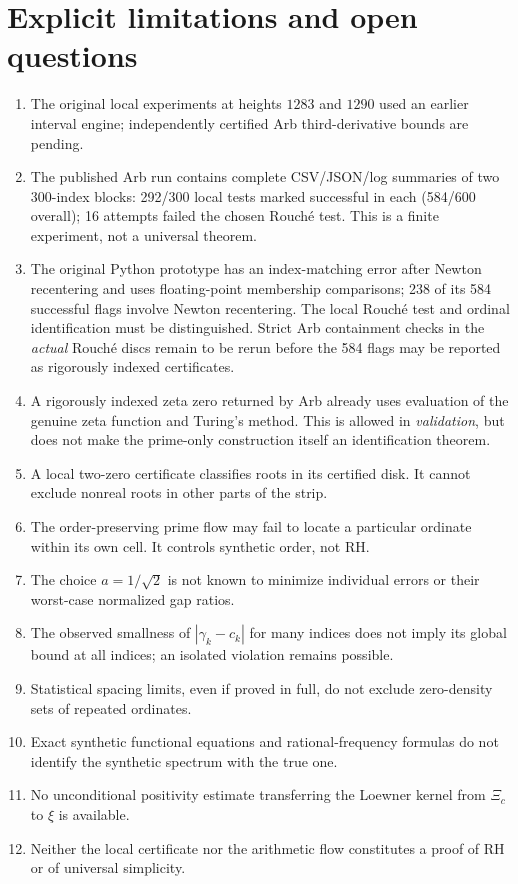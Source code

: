 \documentclass[11pt,reqno]{amsart}
\numberwithin{equation}{section}
\theoremstyle{definition}
\theoremstyle{remark}
\begin{document}
\section{Explicit limitations and open questions}\label{app:limitations}
\begingroup\small
\begin{enumerate}[leftmargin=*,nosep]
\item The original local experiments at heights $1283$ and $1290$ used an earlier interval engine; independently certified Arb third-derivative bounds are pending.
\item The published Arb run contains complete CSV/JSON/log summaries of two 300-index blocks: 292/300 local tests marked successful in each (584/600 overall); 16 attempts failed the chosen Rouch\'e test. This is a finite experiment, not a universal theorem.
\item The original Python prototype has an index-matching error after Newton recentering and uses floating-point membership comparisons; 238 of its 584 successful flags involve Newton recentering. The local Rouch\'e test and ordinal identification must be distinguished. Strict Arb containment checks in the \emph{actual} Rouch\'e discs remain to be rerun before the 584 flags may be reported as rigorously indexed certificates.
\item A rigorously indexed zeta zero returned by Arb already uses evaluation of the genuine zeta function and Turing's method. This is allowed in \emph{validation}, but does not make the prime-only construction itself an identification theorem.
\item A local two-zero certificate classifies roots in its certified disk. It cannot exclude nonreal roots in other parts of the strip.
\item The order-preserving prime flow may fail to locate a particular ordinate within its own cell. It controls synthetic order, not RH.
\item The choice $a=1/\sqrt2$ is not known to minimize individual errors or their worst-case normalized gap ratios.
\item The observed smallness of $|\gamma_k-c_k|$ for many indices does not imply its global bound at all indices; an isolated violation remains possible.
\item Statistical spacing limits, even if proved in full, do not exclude zero-density sets of repeated ordinates.
\item Exact synthetic functional equations and rational-frequency formulas do not identify the synthetic spectrum with the true one.
\item No unconditional positivity estimate transferring the Loewner kernel from $\Xi_c$ to $\xi$ is available.
\item Neither the local certificate nor the arithmetic flow constitutes a proof of RH or of universal simplicity.
\end{enumerate}
\endgroup
\end{document}
